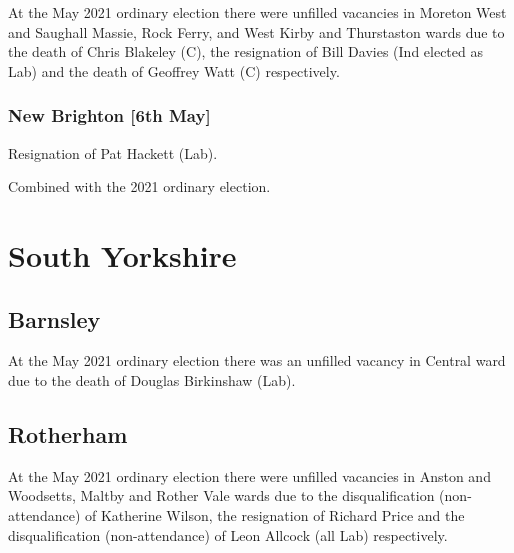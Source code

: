 \documentclass[a4paper,openany]{book}
\begin{document}
\begin{resultsiii}
At the May 2021 ordinary election there were unfilled vacancies in Moreton West and Saughall Massie, Rock Ferry, and West Kirby and Thurstaston wards due to the death of Chris Blakeley (C), the resignation of Bill Davies (Ind elected as Lab) and the death of Geoffrey Watt (C) respectively.

\subsubsection*{New Brighton \hspace*{\fill}\nolinebreak[1]%
	\enspace\hspace*{\fill}
	[6th May]}


Resignation of Pat Hackett (Lab).

Combined with the 2021 ordinary election.

\section{South Yorkshire}

\subsection*{Barnsley}

At the May 2021 ordinary election there was an unfilled vacancy in Central ward due to the death of Douglas Birkinshaw (Lab).

\subsection*{Rotherham}

At the May 2021 ordinary election there were unfilled vacancies in Anston and Woodsetts, Maltby and Rother Vale wards due to the disqualification (non-attendance) of Katherine Wilson, the resignation of Richard Price and the disqualification (non-attendance) of Leon Allcock (all Lab) respectively.


\end{resultsiii}
\end{document}
